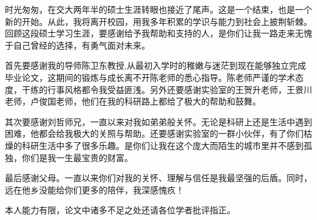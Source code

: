 \begin{thanks}
时光匆匆，在交大两年半的硕士生涯转眼也接近了尾声。这是一个结束，也是一个新的开始。从此，我将离开校园，用我多年积累的学识与能力到社会上披荆斩棘。回顾这段硕士学习生涯，要感谢给予我帮助和支持的人，是你们让我一路走来无愧于自己曾经的选择，有勇气面对未来。

首先要感谢我的导师陈卫东教授,从最初入学时的稚嫩与迷茫到现在能够独立完成毕业论文，这期间的锻炼与成长离不开陈老师的悉心指导。陈老师严谨的学术态度，干练的行事风格都令我受益匪浅。另外还要感谢实验室的王贺升老师，王景川老师，卢俊国老师，他们在我的科研路上都给了极大的帮助和鼓舞。

其次要感谢刘哲师兄，一直以来对我如弟弟般关怀。无论是科研上还是生活中遇到困难，他都会给我极大的关照与帮助。还要感谢实验室的一群小伙伴，有了你们枯燥的科研生活中多了很多乐趣。是你们让我在这个庞大而陌生的城市里并不感到孤独，你们是我一生最宝贵的财富。

最后感谢父母。一直以来你们对我的关怀、理解与信任是我最坚强的后盾。同时，远在他乡没能给你们更多的陪伴，我深感愧疚！

本人能力有限，论文中诸多不足之处还请各位学者批评指正。

\end{thanks}
